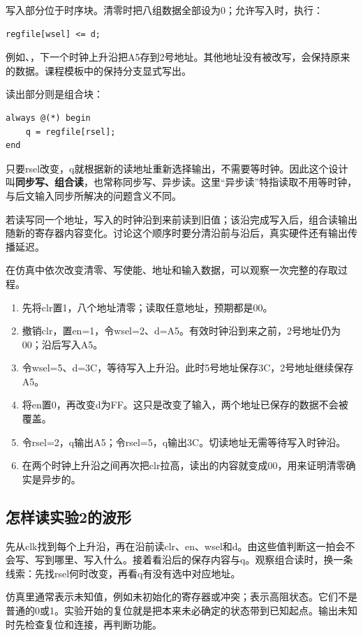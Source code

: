 写入部分位于时序块。清零时把八组数据全部设为0；允许写入时，执行：
\begin{lstlisting}
regfile[wsel] <= d;
\end{lstlisting}
例如、，下一个时钟上升沿把A5存到2号地址。其他地址没有被改写，会保持原来的数据。课程模板中的保持分支显式写出。

读出部分则是组合块：
\begin{lstlisting}
always @(*) begin
    q = regfile[rsel];
end
\end{lstlisting}
只要rsel改变，q就根据新的读地址重新选择输出，不需要等时钟。因此这个设计叫\textbf{同步写、组合读}，也常称同步写、异步读。这里“异步读”特指读取不用等时钟，与后文输入同步所解决的问题含义不同。

若读写同一个地址，写入的时钟沿到来前读到旧值；该沿完成写入后，组合读输出随新的寄存器内容变化。讨论这个顺序时要分清沿前与沿后，真实硬件还有输出传播延迟。

在仿真中依次改变清零、写使能、地址和输入数据，可以观察一次完整的存取过程。

\begin{enumerate}
\item 先将clr置1，八个地址清零；读取任意地址，预期都是00。
\item 撤销clr，置en=1，令wsel=2、d=A5。有效时钟沿到来之前，2号地址仍为00；沿后写入A5。
\item 令wsel=5、d=3C，等待写入上升沿。此时5号地址保存3C，2号地址继续保存A5。
\item 将en置0，再改变d为FF。这只是改变了输入，两个地址已保存的数据不会被覆盖。
\item 令rsel=2，q输出A5；令rsel=5，q输出3C。切读地址无需等待写入时钟沿。
\item 在两个时钟上升沿之间再次把clr拉高，读出的内容就变成00，用来证明清零确实是异步的。
\end{enumerate}

\subsection{怎样读实验2的波形}
先从clk找到每个上升沿，再在沿前读clr、en、wsel和d。由这些值判断这一拍会不会写、写到哪里、写入什么。接着看沿后的保存内容与q。观察组合读时，换一条线索：先找rsel何时改变，再看q有没有选中对应地址。

仿真里通常表示未知值，例如未初始化的寄存器或冲突；表示高阻状态。它们不是普通的0或1。实验开始的复位就是把本来未必确定的状态带到已知起点。输出未知时先检查复位和连接，再判断功能。

